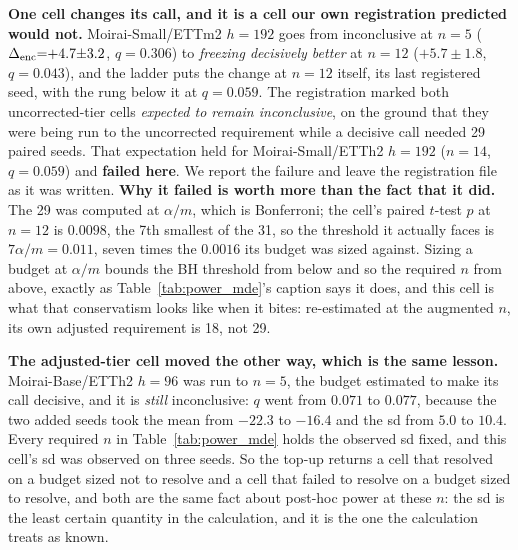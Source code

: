 

\textbf{One cell changes its call, and it is a cell our own registration predicted
would not.}  Moirai-Small/ETTm2 $h{=}192$ goes from inconclusive at $n{=}5$
($\Delta_\text{enc}{=}{+}4.7{\pm}3.2$, $q{=}0.306$) to \emph{freezing decisively better} at
$n{=}12$ ($+5.7{\pm}1.8$, $q{=}0.043$), and the ladder puts the change at $n{=}12$
itself, its last registered seed, with the rung below it at $q{=}0.059$.  The
registration marked both uncorrected-tier cells \emph{expected to remain
inconclusive}, on the ground that they were being run to the uncorrected requirement
while a decisive call needed 29 paired seeds.  That expectation held for
Moirai-Small/ETTh2 $h{=}192$ ($n{=}14$, $q{=}0.059$) and \textbf{failed here}.  We
report the failure and leave the registration file as it was written.
\textbf{Why it failed is worth more than the fact that it did.}  The 29 was computed
at $\alpha/m$, which is Bonferroni; the cell's paired $t$-test $p$ at $n{=}12$ is
$0.0098$, the 7th smallest of the 31, so the threshold it actually faces is
$7\alpha/m{=}0.011$, seven times the $0.0016$ its budget was sized against.
Sizing a budget at $\alpha/m$ bounds the BH threshold from below and so the required
$n$ from above, exactly as Table~\ref{tab:power_mde}'s caption says it does, and this
cell is what that conservatism looks like when it bites: re-estimated at the
augmented $n$, its own adjusted requirement is 18, not 29.

\textbf{The adjusted-tier cell moved the other way, which is the same lesson.}
Moirai-Base/ETTh2 $h{=}96$ was run to $n{=}5$, the budget estimated to make its call
decisive, and it is \emph{still} inconclusive: $q$ went from $0.071$ to $0.077$,
because the two added seeds took the mean from $-22.3$ to $-16.4$ and the sd from
$5.0$ to $10.4$.  Every required $n$ in Table~\ref{tab:power_mde} holds the observed
sd fixed, and this cell's sd was observed on three seeds.  So the top-up returns a
cell that resolved on a budget sized not to resolve and a cell that failed to resolve
on a budget sized to resolve, and both are the same fact about post-hoc power at
these $n$: the sd is the least certain quantity in the calculation, and it is the one
the calculation treats as known.

